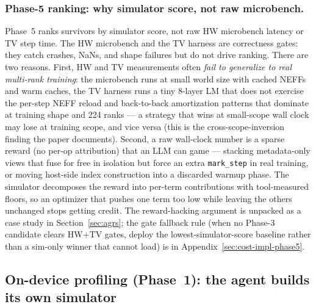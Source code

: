 \subsubsection{Phase-5 ranking: why simulator score, not raw
microbench.} Phase~5 ranks survivors by simulator score, not raw
HW microbench latency or TV step time. The HW microbench and the
TV harness are correctness gates: they catch crashes, NaNs, and
shape failures but do not drive ranking. There are two reasons.
First, HW and TV measurements often \emph{fail to generalize to
real multi-rank training}: the microbench runs at small world size
with cached NEFFs and warm caches, the TV harness runs a tiny
8-layer LM that does not exercise the per-step NEFF reload and
back-to-back amortization patterns that dominate at training shape
and 224 ranks --- a strategy that wins at small-scope wall
clock may lose at training scope, and vice versa
(this is the cross-scope-inversion finding the paper documents).
Second, a raw wall-clock number is a sparse reward (no per-op
attribution) that an LLM can game --- stacking metadata-only views
that fuse for free in isolation but force an extra
\texttt{mark\_step} in real training, or moving host-side index
construction into a discarded warmup phase. The simulator
decomposes the reward into per-term contributions with
tool-measured floors, so an optimizer that pushes one term too low
while leaving the others unchanged stops getting credit. The
reward-hacking argument is unpacked as a case study in
Section~\ref{sec:agrs}; the gate fallback rule (when no Phase-3
candidate clears HW+TV gates, deploy the lowest-simulator-score
baseline rather than a sim-only winner that cannot load) is in
Appendix~\ref{sec:cost-impl-phase5}.

\subsection{On-device profiling (Phase~1): the agent builds its
own simulator}
\label{sec:profiling}

